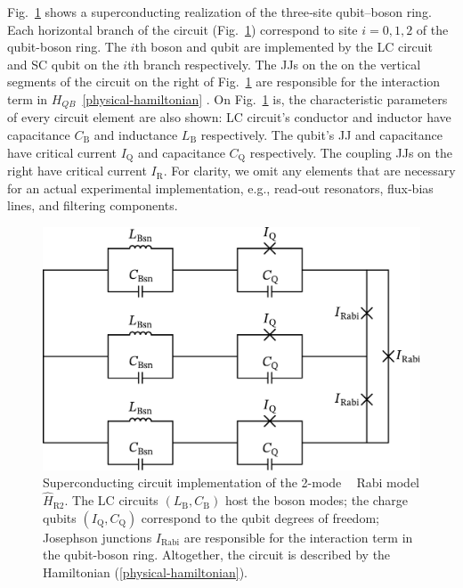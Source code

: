 \documentclass[reprint, aps, prx, amsmath, amssymb, longbibliography, superscriptaddress]{revtex4-2}
\DeclareMathOperator{\Zthree}{\mathbb{Z}_3}
\begin{document}
Fig.~\ref{fig:superconducting-Rabi} shows a superconducting realization of the three‑site qubit–boson ring. Each horizontal branch of the circuit (Fig.~\ref{fig:superconducting-Rabi}) correspond to site $i = 0,1,2$ of the qubit-boson ring. The $i$th boson and qubit are implemented by the LC circuit and SC qubit on the $i$th branch respectively. The JJs on the on the vertical segments of the circuit on the right of Fig.~\ref{fig:superconducting-Rabi} are responsible for the interaction term in $H_{QB}$~\eqref{physical-hamiltonian} \cite{siewert_aspects_2000,rasmussen_controllable_2019,shafranjuk_twoqubit_2006,allman_tunable_2014,hu_controllable_2007}. On Fig.~\ref{fig:superconducting-Rabi} is, the characteristic parameters of every circuit element are also shown: LC circuit's conductor and inductor have capacitance $C_{\text{B}}$ and inductance $L_{\text{B}}$ respectively. The qubit's JJ and capacitance have critical current $I_{\text{Q}}$ and capacitance $C_{\text{Q}}$ respectively. The coupling JJs on the right have critical current $I_{\text{R}}$. For clarity, we omit any elements that are necessary for an actual experimental implementation, e.g., read‑out resonators, flux‑bias lines, and filtering components.

\begin{figure}[t]
  \includegraphics[width=\linewidth]{pics/SC_Rabi_circuit_svg-tex.pdf}
  \caption{Superconducting circuit implementation of the 2-mode $\Zthree$ Rabi model $\hat H_{\text{R}2}$. The LC circuits $(L_{\text{B}}, C_{\text{B}})$ host the boson modes; the charge qubits $(I_{\text{Q}}, C_{\text{Q}})$ correspond to the qubit degrees of freedom; Josephson junctions $I_{\text{Rabi}}$ are responsible for the interaction term in the qubit-boson ring. Altogether, the circuit is described by the Hamiltonian (\ref{physical-hamiltonian}).}
  \label{fig:superconducting-Rabi}
\end{figure}
\end{document}
